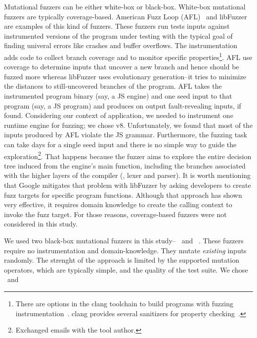 \documentclass[10pt,conference,anonymous]{IEEEtran}
\begin{document}

Mutational fuzzers can be either white-box or black-box. White-box
mutational fuzzers are typically coverage-based. American Fuzz Loop
(AFL)~\cite{afl} and libFuzzer~\cite{libfuzzer} are examples of this
kind of fuzzers. These fuzzers run tests inputs against instrumented
versions of the program under testing with the typical goal of finding
univeral errors like crashes and buffer overflows. The instrumentation
adds code to collect branch coverage and to monitor specific
properties\footnote{There are options in the clang toolchain to build
  programs with fuzzing instrumentation~\cite{libfuzzer}. clang
  provides several sanitizers for property
  checking~\cite{clang-documentation}.}. AFL use coverage to determine
inputs that uncover a new branch and hence should be fuzzed more
whereas libFuzzer uses evolutionary generation--it tries to minimize
the distances to still-uncovered branches of the program. AFL takes
the instrumented program binary (say, a JS engine) and one seed input
to that program (say, a JS program) and produces on output
fault-revealing inputs, if found. Considering our context of
application, we needed to instrument one runtime engine for fuzzing;
we chose v8. Unfortunately, we found that most of the inputs produced
by AFL violate the JS grammar. Furthermore, the fuzzing task can take
days for a single seed input and there is no simple way to guide the
exploration\footnote{Exchanged emails with the tool author.}. That
happens because the fuzzer aims to explore the entire decision tree
induced from the engine's main function, including the branches
associated with the higher layers of the compiler (\eg{}, lexer and
parser). It is worth mentioning that Google mitigates that problem
with libFuzzer by asking developers to create fuzz targets for
specific program
functions\cite{libFuzzer-tutorial-google,libFuzzer-chromium-google}. Although
that approach has shown very effective, it requires domain knowledge
to create the calling context to invoke the fuzz target. For those
reasons, coverage-based fuzzers were not considered in this study.

We used two black-box mutational fuzzers in this
study--\radamsa~\cite{radamsa} and \quickfuzz~\cite{quickfuzz}. These
fuzzers require no instrumentation and domain-knowledge. They mutate
\emph{existing} inputs randomly. The strenght of the approach is
limited by the supported mutation operators, which are typically
simple, and the quality of the test suite. We chose \radamsa\ and
\quickfuzz\ 
\end{document}

